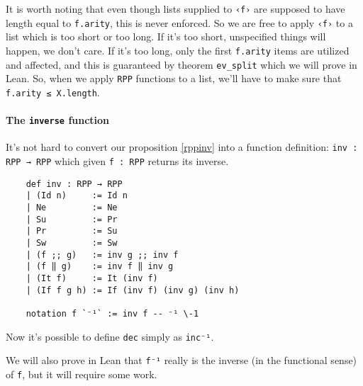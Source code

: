 \documentclass[runningheads]{llncs}
\begin{document}
It is worth noting that even though lists supplied to \lstinline{‹f›} are supposed to have length equal to \lstinline{f.arity},
this is never enforced.
So we are free to apply \lstinline{‹f›} to a list which is too short or too long.
If it's too short, unspecified things will happen, we don't care.
If it's too long, only the first \lstinline{f.arity} items are utilized and affected,
and this is guaranteed by theorem \lstinline{ev_split} which we will prove in Lean.
So, when we apply \lstinline{RPP} functions to a list, we'll have to make sure that
\lstinline{f.arity ≤ X.length}.

\paragraph{The \lstinline{inverse} function}
It's not hard to convert our proposition \ref{rppinv} into a function definition:
\lstinline{inv : RPP → RPP} which given \lstinline{f : RPP} returns its inverse.
\begin{lstlisting}
    def inv : RPP → RPP
    | (Id n)     := Id n
    | Ne         := Ne
    | Su         := Pr
    | Pr         := Su
    | Sw         := Sw
    | (f ;; g)   := inv g ;; inv f
    | (f ‖ g)    := inv f ‖ inv g
    | (It f)     := It (inv f)
    | (If f g h) := If (inv f) (inv g) (inv h)

    notation f `⁻¹` := inv f -- ⁻¹ \-1
\end{lstlisting}
Now it's possible to define \lstinline{dec} simply as \lstinline{inc⁻¹}.

We will also prove in Lean that \lstinline{f⁻¹} really is the inverse (in the functional sense) of \lstinline{f},
but it will require some work.
\end{document}
